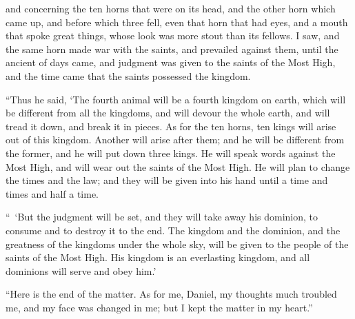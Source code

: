 {and concerning the ten horns that were on its head, and the other horn which came up, and before which three fell, even that horn that had eyes, and a mouth that spoke great things, whose look was more stout than its fellows.
I saw, and the same horn made war with the saints, and prevailed against them,
until the ancient of days came, and judgment was given to the saints of the Most High, and the time came that the saints possessed the kingdom.
\par }{\PP {}“Thus he said, ‘The fourth animal will be a fourth kingdom on earth, which will be different from all the kingdoms, and will devour the whole earth, and will tread it down, and break it in pieces.
As for the ten horns, ten kings will arise out of this kingdom. Another will arise after them; and he will be different from the former, and he will put down three kings.
He will speak words against the Most High, and will wear out the saints of the Most High. He will plan to change the times and the law; and they will be given into his hand until a time and times and half a time.
\par }{\PP {}“ ‘But the judgment will be set, and they will take away his dominion, to consume and to destroy it to the end.
The kingdom and the dominion, and the greatness of the kingdoms under the whole sky, will be given to the people of the saints of the Most High. His kingdom is an everlasting kingdom, and all dominions will serve and obey him.’
\par }{\PP {}“Here is the end of the matter. As for me, Daniel, my thoughts much troubled me, and my face was changed in me; but I kept the matter in my heart.”

}
